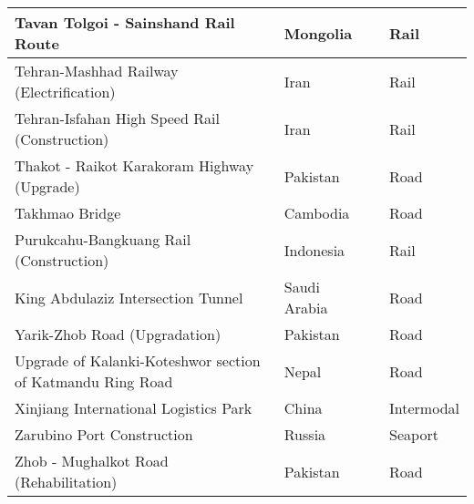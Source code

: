 \documentclass{article}
\begin{document}
\begin{center}
\begin{landscape}
\begin{longtable}{p{10cm}p{5cm}p{2cm}p{2cm}}
Tavan Tolgoi - Sainshand Rail Route	&	Mongolia	&		&	Rail	\\	\hline
Tehran-Mashhad Railway (Electrification)	&	Iran	&		&	Rail	\\	\hline
Tehran-Isfahan High Speed Rail (Construction)	&	Iran	&		&	Rail	\\	\hline
Thakot - Raikot Karakoram Highway (Upgrade)	&	Pakistan	&		&	Road	\\	\hline
Takhmao Bridge	&	Cambodia	&		&	Road	\\	\hline
Purukcahu-Bangkuang Rail (Construction)	&	Indonesia	&		&	Rail	\\	\hline
King Abdulaziz Intersection Tunnel	&	Saudi Arabia	&		&	Road	\\	\hline
Yarik-Zhob Road (Upgradation)	&	Pakistan	&		&	Road	\\	\hline
Upgrade of Kalanki-Koteshwor section of Katmandu Ring Road	&	Nepal	&		&	Road	\\	\hline
Xinjiang International Logistics Park	&	China	&		&	Intermodal	\\	\hline
Zarubino Port Construction	&	Russia	&		&	Seaport	\\	\hline
Zhob - Mughalkot Road (Rehabilitation)	&	Pakistan	&		&	Road	\\	\hline

\end{longtable}
\end{landscape}
\end{center}
\end{document}
